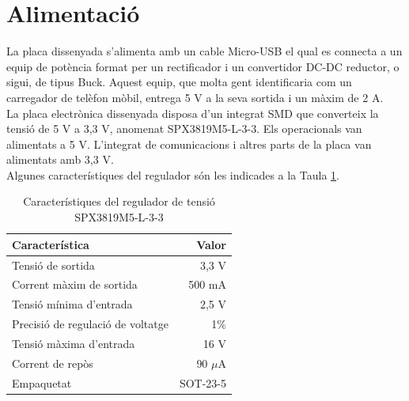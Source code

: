 \section{Alimentació}
La placa dissenyada s'alimenta amb un cable Micro-USB el qual es connecta a un equip de potència format per un rectificador i un convertidor DC-DC reductor, o sigui, de tipus Buck. Aquest equip, que molta gent identificaria com un carregador de telèfon mòbil, entrega 5 V a la seva sortida i un màxim de 2 A.\\
\newline La placa electrònica dissenyada disposa d'un integrat SMD que converteix la tensió de 5 V a 3,3 V, anomenat SPX3819M5-L-3-3. Els operacionals van alimentats a 5 V. L'integrat de comunicacions i altres parts de la placa van alimentats amb 3,3 V.\\
\newline Algunes característiques del regulador són les indicades a la Taula \ref{tab:regulador}.
\begin{table}[H]
\small
\begin{center}
 \begin{tabular} {|l|r|}%
 \hline
 Característica & Valor \\
 \hline \hline 
Tensió de sortida & 3,3 V \\ \hline
Corrent màxim de sortida & 500 mA\\ \hline
Tensió mínima d'entrada & 2,5 V \\ \hline
Precisió de regulació de voltatge & 1\% \\ \hline
Tensió màxima d'entrada & 16 V \\ \hline
Corrent de repòs & 90 $\mu$A \\ \hline
Empaquetat & SOT-23-5 \\ \hline

 \end{tabular}
 \caption{Característiques del regulador de tensió SPX3819M5-L-3-3}
 \label{tab:regulador}
\end{center}
\end{table}

